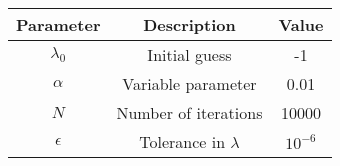 
\begin{center}
\begin{tabular}{|c|c|c|}
\hline
\textbf{Parameter}& \textbf{Description} &\textbf{Value}\\ \hline
$\lambda_0$		 &	Initial guess& -1 \\ \hline
$\alpha $		 &	Variable parameter & 0.01\\ \hline
$N$		 	     &  Number of iterations &   10000\\ \hline
$\epsilon$		 &  Tolerance in $\lambda$	& $10^{-6}$ \\ \hline
\end{tabular}
\end{center}
